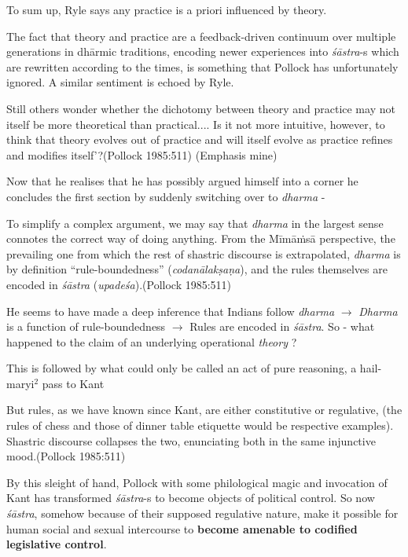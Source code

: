 To sum up, Ryle says any practice is a priori influenced by theory.

The fact that theory and practice are a feedback-driven continuum over multiple generations in dhārmic traditions, encoding newer experiences into {\sl śāstra}-s which are rewritten according to the times, is something that Pollock has unfortunately ignored. A similar sentiment is echoed by Ryle.
\begin{myquote}
Still others wonder whether the dichotomy between theory and practice may not itself be more theoretical than practical.... Is it not more intuitive, however, to think that theory evolves out of practice and will itself evolve as practice refines and modifies itself'?\hfill (Pollock 1985:511) (Emphasis mine)
\end{myquote}

Now that he realises that he has possibly argued himself into a corner he concludes the first section by suddenly switching over to {\sl dharma} - 
\begin{myquote}
To simplify a complex argument, we may say that {\sl dharma} in the largest sense connotes the correct way of doing anything. From the Mīmāṁsā perspective, the prevailing one from which the rest of shastric discourse is extrapolated, {\sl dharma} is by definition ``rule-boundedness'' ({\sl codanālakṣaṇa}), and the rules themselves are encoded in {\sl śāstra} ({\sl upadeśa}).\hfill (Pollock 1985:511)
\end{myquote}

He seems to have made a deep inference that Indians follow {\sl dharma} $\to$ {\sl Dharma} is a function of rule-boundedness $\to$ Rules are encoded in {\sl śāstra}. So - what happened to the claim of an underlying operational {\sl theory} ?

This is followed by what could only be called an act of pure reasoning, a hail-maryi$^{2}$ pass to Kant
\begin{myquote}
But rules, as we have known since Kant, are either constitutive or regulative, (the rules of chess and those of dinner table etiquette would be respective examples). Shastric discourse collapses the two, enunciating both in the same injunctive mood.\hfill (Pollock 1985:511)
\end{myquote}

By this sleight of hand, Pollock with some philological magic and invocation of Kant has transformed {\sl śāstra}-s to become objects of political control. So now {\sl śāstra}, somehow because of their supposed regulative nature, make it possible for human social and sexual intercourse to {\bf become amenable to codified legislative control}.

